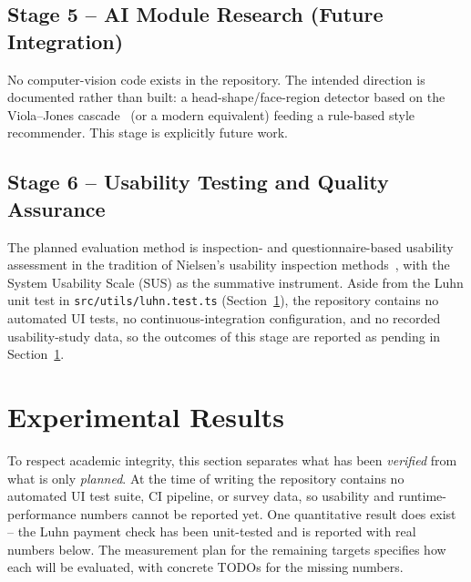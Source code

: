 \documentclass[14pt]{article}
\begin{document}
\subsection{Stage 5 -- AI Module Research (Future Integration)}
No computer-vision code exists in the repository. The intended direction
is documented rather than built: a head-shape/face-region detector based
on the Viola--Jones cascade~\citep{viola2001rapid} (or a modern
equivalent) feeding a rule-based style recommender. This stage is
explicitly future work.

\subsection{Stage 6 -- Usability Testing and Quality Assurance}
The planned evaluation method is inspection- and questionnaire-based
usability assessment in the tradition of Nielsen's usability inspection
methods~\citep{nielsen1994usability}, with the System Usability Scale (SUS)
as the summative instrument. Aside from the Luhn unit test in
\texttt{src/utils/luhn.test.ts} (Section~\ref{sec:exp}), the repository
contains no automated UI tests, no continuous-integration configuration,
and no recorded usability-study data, so the outcomes of this stage are
reported as pending in Section~\ref{sec:exp}.

\section{Experimental Results}
\label{sec:exp}
To respect academic integrity, this section separates what has been
\emph{verified} from what is only \emph{planned}. At the time of writing
the repository contains no automated UI test suite, CI pipeline, or
survey data, so usability and runtime-performance numbers cannot be
reported yet. One quantitative result does exist -- the Luhn payment
check has been unit-tested and is reported with real numbers below. The
measurement plan for the remaining targets specifies how each will be
evaluated, with concrete TODOs for the missing numbers.
\end{document}
